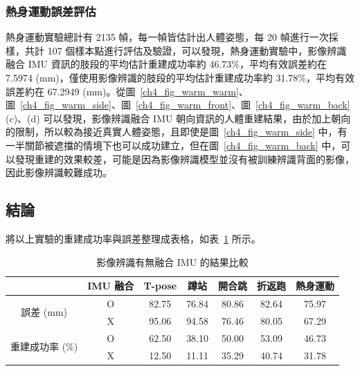 \subsubsection*{熱身運動誤差評估}
熱身運動實驗總計有 2135 幀，每一幀皆估計出人體姿態，每 20 幀進行一次採樣，共計 107 個樣本點進行評估及驗證，可以發現，熱身運動實驗中，影像辨識融合 IMU 資訊的肢段的平均估計重建成功率約 46.73\%，平均有效誤差約在 7.5974 (mm)，僅使用影像辨識的肢段的平均估計重建成功率約 31.78\%，平均有效誤差約在 67.2949 (mm)。從圖~\ref{ch4_fig_warm_warm}、圖~\ref{ch4_fig_warm_side}、圖~\ref{ch4_fig_warm_front}、圖~\ref{ch4_fig_warm_back} (c)、(d) 可以發現，影像辨識融合 IMU 朝向資訊的人體重建結果，由於加上朝向的限制，所以較為接近真實人體姿態，且即使是圖~\ref{ch4_fig_warm_side} 中，有一半關節被遮擋的情境下也可以成功建立，但在圖~\ref{ch4_fig_warm_back} 中，可以發現重建的效果較差，可能是因為影像辨識模型並沒有被訓練辨識背面的影像，因此影像辨識較難成功。

\subsection{結論}
將以上實驗的重建成功率與誤差整理成表格，如表~\ref{ch4_tab_conclusion} 所示。
\begin{table}[ht!]
   \caption{影像辨識有無融合 IMU 的結果比較}
   \label{ch4_tab_conclusion}
   \centering
   \begin{tabular}{ccccccc}
   \toprule
    & IMU 融合 & T-pose & 蹲站 & 開合跳 & 折返跑 & 熱身運動 \\
   \midrule
   \multirow{2}{*}{誤差 (mm)} & O & 82.75 & 76.84 & 80.86 & 82.64 & 75.97 \\
   & X & 95.06 & 94.58 & 76.46 & 80.05 & 67.29 \\
   \midrule
   \multirow{2}{*}{重建成功率 (\%)} & O & 62.50 & 38.10 & 50.00 & 53.09 & 46.73 \\
   & X & 12.50 & 11.11 & 35.29 & 40.74 & 31.78 \\
   \bottomrule
   \end{tabular}
\end{table}

